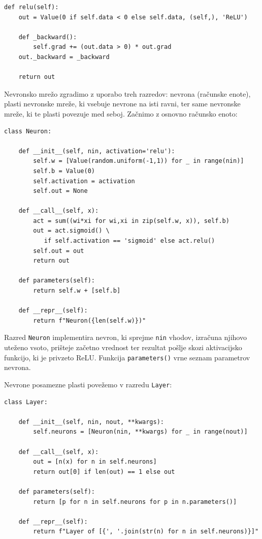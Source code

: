 \vspace*{3mm}
\begin{lstlisting}
def relu(self):
    out = Value(0 if self.data < 0 else self.data, (self,), 'ReLU')

    def _backward():
        self.grad += (out.data > 0) * out.grad
    out._backward = _backward

    return out
\end{lstlisting}

Nevronsko mrežo zgradimo z uporabo treh razredov: nevrona (računske enote), plasti nevronske mreže, ki vsebuje nevrone na isti ravni, ter same nevronske mreže, ki te plasti povezuje med seboj. Začnimo z osnovno računsko enoto:

\vspace*{3mm}
\begin{lstlisting}
class Neuron:

    def __init__(self, nin, activation='relu'):
        self.w = [Value(random.uniform(-1,1)) for _ in range(nin)]
        self.b = Value(0)
        self.activation = activation
        self.out = None

    def __call__(self, x):
        act = sum((wi*xi for wi,xi in zip(self.w, x)), self.b)
        out = act.sigmoid() \
           if self.activation == 'sigmoid' else act.relu()
        self.out = out
        return out

    def parameters(self):
        return self.w + [self.b]

    def __repr__(self):
        return f"Neuron({len(self.w)})"
\end{lstlisting}

Razred \texttt{Neuron} implementira nevron, ki sprejme \texttt{nin} vhodov, izračuna njihovo uteženo vsoto, prišteje začetno vrednost ter rezultat pošlje skozi aktivacijsko funkcijo, ki je privzeto ReLU. Funkcija \texttt{parameters()} vrne seznam parametrov nevrona.

Nevrone posamezne plasti povežemo v razredu \texttt{Layer}:

\vspace*{3mm}
\begin{lstlisting}
class Layer:

    def __init__(self, nin, nout, **kwargs):
        self.neurons = [Neuron(nin, **kwargs) for _ in range(nout)]

    def __call__(self, x):
        out = [n(x) for n in self.neurons]
        return out[0] if len(out) == 1 else out

    def parameters(self):
        return [p for n in self.neurons for p in n.parameters()]

    def __repr__(self):
        return f"Layer of [{', '.join(str(n) for n in self.neurons)}]"
\end{lstlisting}

